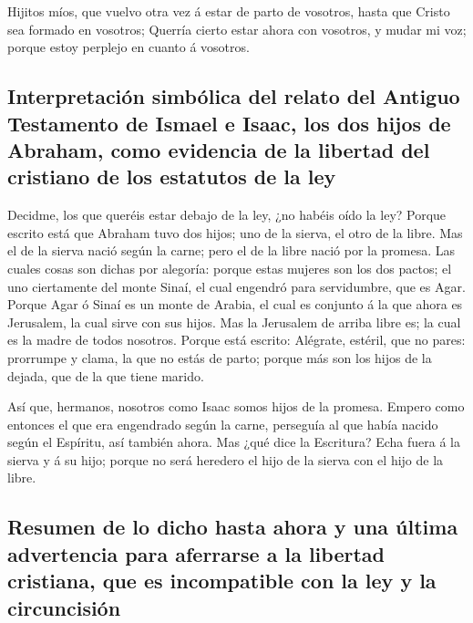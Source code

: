  Hijitos míos, que vuelvo otra vez á estar de parto de
vosotros, hasta que Cristo sea formado en vosotros; 
Querría cierto estar ahora con vosotros, y mudar mi voz; porque estoy
perplejo en cuanto á vosotros.

\hypertarget{interpretaciuxf3n-simbuxf3lica-del-relato-del-antiguo-testamento-de-ismael-e-isaac-los-dos-hijos-de-abraham-como-evidencia-de-la-libertad-del-cristiano-de-los-estatutos-de-la-ley}{%
\subsection{Interpretación simbólica del relato del Antiguo Testamento
de Ismael e Isaac, los dos hijos de Abraham, como evidencia de la
libertad del cristiano de los estatutos de la
ley}\label{interpretaciuxf3n-simbuxf3lica-del-relato-del-antiguo-testamento-de-ismael-e-isaac-los-dos-hijos-de-abraham-como-evidencia-de-la-libertad-del-cristiano-de-los-estatutos-de-la-ley}}

 Decidme, los que queréis estar debajo de la ley, ¿no
habéis oído la ley?  Porque escrito está que Abraham tuvo
dos hijos; uno de la sierva, el otro de la libre.  Mas el
de la sierva nació según la carne; pero el de la libre nació por la
promesa.  Las cuales cosas son dichas por alegoría:
porque estas mujeres son los dos pactos; el uno ciertamente del monte
Sinaí, el cual engendró para servidumbre, que es Agar. 
Porque Agar ó Sinaí es un monte de Arabia, el cual es conjunto á la que
ahora es Jerusalem, la cual sirve con sus hijos.  Mas la
Jerusalem de arriba libre es; la cual es la madre de todos nosotros.
 Porque está escrito: Alégrate, estéril, que no pares:
prorrumpe y clama, la que no estás de parto; porque más son los hijos de
la dejada, que de la que tiene marido.

 Así que, hermanos, nosotros como Isaac somos hijos de la
promesa.  Empero como entonces el que era engendrado
según la carne, perseguía al que había nacido según el Espíritu, así
también ahora.  Mas ¿qué dice la Escritura? Echa fuera á
la sierva y á su hijo; porque no será heredero el hijo de la sierva con
el hijo de la libre.

\hypertarget{resumen-de-lo-dicho-hasta-ahora-y-una-uxfaltima-advertencia-para-aferrarse-a-la-libertad-cristiana-que-es-incompatible-con-la-ley-y-la-circuncisiuxf3n}{%
\subsection{Resumen de lo dicho hasta ahora y una última advertencia
para aferrarse a la libertad cristiana, que es incompatible con la ley y
la
circuncisión}\label{resumen-de-lo-dicho-hasta-ahora-y-una-uxfaltima-advertencia-para-aferrarse-a-la-libertad-cristiana-que-es-incompatible-con-la-ley-y-la-circuncisiuxf3n}}

